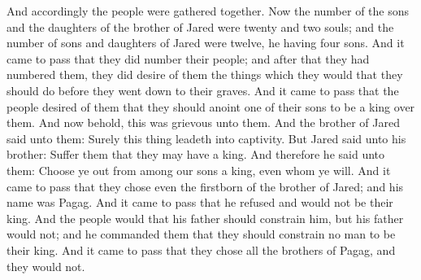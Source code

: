 And accordingly the people were gathered together. Now the number of the sons and the daughters of the brother of Jared were twenty and two souls; and the number of sons and daughters of Jared were twelve, he having four sons.
\bverse \iffalse And it came to pass that they did number their people; and after that they had numbered them, they did desire of them the things which they would that they should do before they went down to their graves. \fi
And it came to pass that they did number their people; and after that they had numbered them, they did desire of them the things which they would that they should do before they went down to their graves.
\bverse \iffalse And it came to pass that the people desired of them that they should anoint one of their sons to be a king over them. \fi
And it came to pass that the people desired of them that they should anoint one of their sons to be a king over them.
\bverse \iffalse And now behold, this was grievous unto them. And the brother of Jared said unto them: Surely this thing leadeth into captivity. \fi
And now behold, this was grievous unto them. And the brother of Jared said unto them: Surely this thing leadeth into captivity.
\bverse \iffalse But Jared said unto his brother: Suffer them that they may have a king. And therefore he said unto them: Choose ye out from among our sons a king, even whom ye will. \fi
But Jared said unto his brother: Suffer them that they may have a king. And therefore he said unto them: Choose ye out from among our sons a king, even whom ye will.
\bverse \iffalse And it came to pass that they chose even the firstborn of the brother of Jared; and his name was Pagag. And it came to pass that he refused and would not be their king. And the people would that his father should constrain him, but his father would not; and he commanded them that they should constrain no man to be their king. \fi
And it came to pass that they chose even the firstborn of the brother of Jared; and his name was Pagag. And it came to pass that he refused and would not be their king. And the people would that his father should constrain him, but his father would not; and he commanded them that they should constrain no man to be their king.
\bverse \iffalse And it came to pass that they chose all the brothers of Pagag, and they would not. \fi
And it came to pass that they chose all the brothers of Pagag, and they would not.
\bverse \iffalse And it came to pass that neither would the sons of Jared, even all save it were one; and Orihah was anointed to be king over the people. \fi
